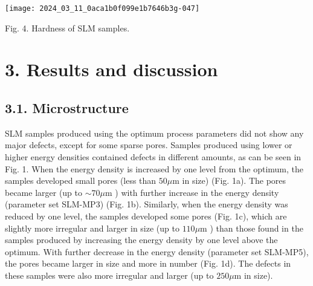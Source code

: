 \documentclass[10pt]{article}
\begin{document}
\begin{center}
\texttt{[image: 2024\_03\_11\_0aca1b0f099e1b7646b3g-047]}
\end{center}

Fig. 4. Hardness of SLM samples.

\section*{3. Results and discussion}
\subsection*{3.1. Microstructure}
SLM samples produced using the optimum process parameters did not show any major defects, except for some sparse pores. Samples produced using lower or higher energy densities contained defects in different amounts, as can be seen in Fig. 1. When the energy density is increased by one level from the optimum, the samples developed small pores (less than $50 \mu \mathrm{m}$ in size) (Fig. 1a). The pores became larger (up to $\sim 70 \mu \mathrm{m}$ ) with further increase in the energy density (parameter set SLM-MP3) (Fig. 1b). Similarly, when the energy density was reduced by one level, the samples developed some pores (Fig. 1c), which are slightly more irregular and larger in size (up to $110 \mu \mathrm{m}$ ) than those found in the samples produced by increasing the energy density by one level above the optimum. With further decrease in the energy density (parameter set SLM-MP5), the pores became larger in size and more in number (Fig. 1d). The defects in these samples were also more irregular and larger (up to $250 \mu \mathrm{m}$ in size).
\end{document}
